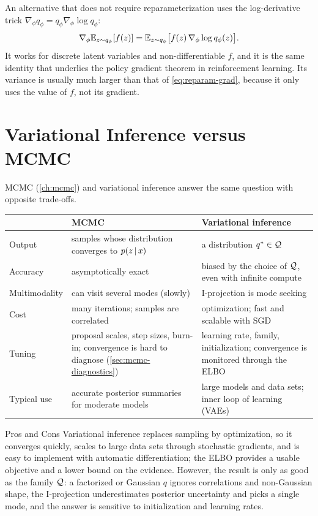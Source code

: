 \begin{remark}
An alternative that does not require reparameterization uses the log-derivative trick $\nabla_\phi q_\phi=q_\phi\nabla_\phi\log q_\phi$:
\[
\nabla_\phi\mathbb{E}_{z\sim q_\phi}[f(z)]=\mathbb{E}_{z\sim q_\phi}\big[f(z)\,\nabla_\phi\log q_\phi(z)\big].
\]
It works for discrete latent variables and non-differentiable $f$, and it is the same identity that underlies the policy gradient theorem in reinforcement learning. Its variance is usually much larger than that of \eqref{eq:reparam-grad}, because it only uses the value of $f$, not its gradient.
\end{remark}

\section{Variational Inference versus MCMC}\label{sec:vi-vs-mcmc}

MCMC (\cref{ch:mcmc}) and variational inference answer the same question with opposite trade-offs.

\begin{center}
\small
\begin{tabularx}{\textwidth}{@{}l>{\raggedright\arraybackslash}X>{\raggedright\arraybackslash}X@{}}
\toprule
 & MCMC & Variational inference \\
\midrule
Output & samples whose distribution converges to $p(z\,|\, x)$ & a distribution $q^*\in\mathcal{Q}$ \\
Accuracy & asymptotically exact & biased by the choice of $\mathcal{Q}$, even with infinite compute \\
Multimodality & can visit several modes (slowly) & I-projection is mode seeking \\
Cost & many iterations; samples are correlated & optimization; fast and scalable with SGD \\
Tuning & proposal scales, step sizes, burn-in; convergence is hard to diagnose (\cref{sec:mcmc-diagnostics}) & learning rate, family, initialization; convergence is monitored through the ELBO \\
Typical use & accurate posterior summaries for moderate models & large models and data sets; inner loop of learning (VAEs) \\
\bottomrule
\end{tabularx}
\end{center}

\begin{notebox}{Pros and Cons}
Variational inference replaces sampling by optimization, so it converges quickly, scales to large data sets through stochastic gradients, and is easy to implement with automatic differentiation; the ELBO provides a usable objective and a lower bound on the evidence. However, the result is only as good as the family $\mathcal{Q}$: a factorized or Gaussian $q$ ignores correlations and non-Gaussian shape, the I-projection underestimates posterior uncertainty and picks a single mode, and the answer is sensitive to initialization and learning rates.
\end{notebox}

